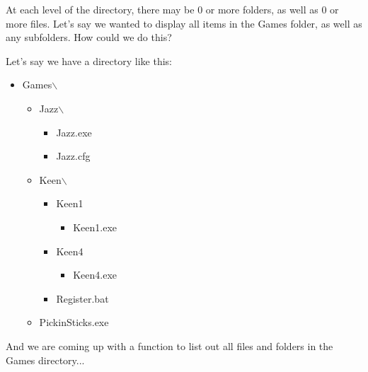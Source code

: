 \documentclass[a4paper,12pt,oneside]{book}
\begin{document}
At each level of the directory, there may be 0 or more folders, as well as 0 or more files.
Let's say we wanted to display all items in the Games folder, as well as any subfolders.
How could we do this?

\newpage

Let's say we have a directory like this:

\begin{itemize}
    \item   Games$\backslash$
    \begin{itemize}
        \item   Jazz$\backslash$
        \begin{itemize}
            \item   Jazz.exe
            \item   Jazz.cfg
        \end{itemize}
        
        \item   Keen$\backslash$
        \begin{itemize}
            \item   Keen1
            \begin{itemize}
                \item   Keen1.exe
            \end{itemize}
            \item   Keen4
            \begin{itemize}
                \item   Keen4.exe
            \end{itemize}
            \item   Register.bat
        \end{itemize}
        
        \item   PickinSticks.exe
    \end{itemize}
\end{itemize}

And we are coming up with a function to list out all files and folders in the Games directory...
\end{document}
